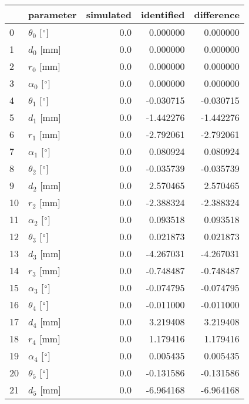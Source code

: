 \documentclass{standalone}%
\begin{document}
%
\normalsize%
\begin{tabular}{llrrr}
\toprule
{} &                 parameter & simulated & identified & difference \\
\midrule
0  &  $\theta_{0}$ [$\degree$] &       0.0 &   0.000000 &   0.000000 \\
1  &              $d_{0}$ [mm] &       0.0 &   0.000000 &   0.000000 \\
2  &              $r_{0}$ [mm] &       0.0 &   0.000000 &   0.000000 \\
3  &  $\alpha_{0}$ [$\degree$] &       0.0 &   0.000000 &   0.000000 \\
4  &  $\theta_{1}$ [$\degree$] &       0.0 &  -0.030715 &  -0.030715 \\
5  &              $d_{1}$ [mm] &       0.0 &  -1.442276 &  -1.442276 \\
6  &              $r_{1}$ [mm] &       0.0 &  -2.792061 &  -2.792061 \\
7  &  $\alpha_{1}$ [$\degree$] &       0.0 &   0.080924 &   0.080924 \\
8  &  $\theta_{2}$ [$\degree$] &       0.0 &  -0.035739 &  -0.035739 \\
9  &              $d_{2}$ [mm] &       0.0 &   2.570465 &   2.570465 \\
10 &              $r_{2}$ [mm] &       0.0 &  -2.388324 &  -2.388324 \\
11 &  $\alpha_{2}$ [$\degree$] &       0.0 &   0.093518 &   0.093518 \\
12 &  $\theta_{3}$ [$\degree$] &       0.0 &   0.021873 &   0.021873 \\
13 &              $d_{3}$ [mm] &       0.0 &  -4.267031 &  -4.267031 \\
14 &              $r_{3}$ [mm] &       0.0 &  -0.748487 &  -0.748487 \\
15 &  $\alpha_{3}$ [$\degree$] &       0.0 &  -0.074795 &  -0.074795 \\
16 &  $\theta_{4}$ [$\degree$] &       0.0 &  -0.011000 &  -0.011000 \\
17 &              $d_{4}$ [mm] &       0.0 &   3.219408 &   3.219408 \\
18 &              $r_{4}$ [mm] &       0.0 &   1.179416 &   1.179416 \\
19 &  $\alpha_{4}$ [$\degree$] &       0.0 &   0.005435 &   0.005435 \\
20 &  $\theta_{5}$ [$\degree$] &       0.0 &  -0.131586 &  -0.131586 \\
21 &              $d_{5}$ [mm] &       0.0 &  -6.964168 &  -6.964168 \\

\end{tabular}
\end{document}
